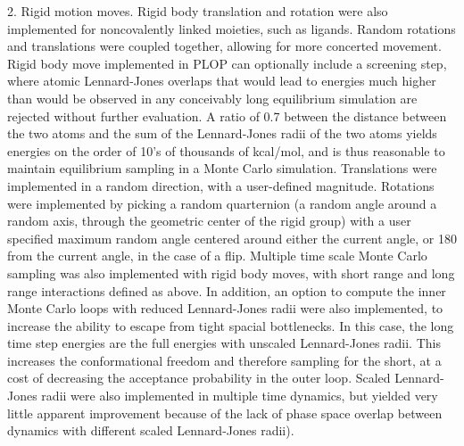 2.
Rigid motion moves.
Rigid body translation and rotation were also implemented for noncovalently linked moieties, such as ligands.
Random rotations and translations were coupled together, allowing for more concerted movement.
Rigid body move implemented in PLOP can optionally include a screening step, where atomic Lennard-Jones overlaps that would lead to energies much higher than would be observed in any conceivably long equilibrium simulation are rejected without further evaluation.
A ratio of 0.7 between the distance between the two atoms and the sum of the Lennard-Jones radii of the two atoms yields energies on the order of 10's of thousands of kcal/mol, and is thus reasonable to maintain equilibrium sampling in a Monte Carlo simulation.
Translations were implemented in a random direction, with a user-defined magnitude.
Rotations were implemented by picking a random quarternion (a random angle around a random axis, through the geometric center of the rigid group) with a user specified maximum random angle centered around either the current angle, or 180 from the current angle, in the case of a flip.
Multiple time scale Monte Carlo sampling was also implemented with rigid body moves, with short range and long range interactions defined as above.
In addition, an option to compute the inner Monte Carlo loops with reduced Lennard-Jones radii were also implemented, to increase the ability to escape from tight spacial bottlenecks.
In this case, the long time step energies are the full energies with unscaled Lennard-Jones radii.
This increases the conformational freedom and therefore sampling for the short, at a cost of decreasing the acceptance probability in the outer loop.
Scaled Lennard-Jones radii were also implemented in multiple time dynamics, but yielded very little apparent improvement because of the lack of phase space overlap between dynamics with different scaled Lennard-Jones radii).

